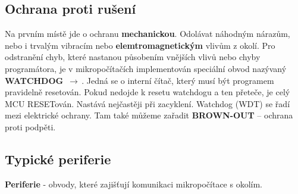 \subsection{Ochrana proti rušení}
Na prvním místě jde o ochranu \textbf{mechanickou}. Odolávat náhodným nárazům, nebo i trvalým vibracím nebo \textbf{elemtromagnetickým} vlivům z okolí. Pro odstranění chyb, které nastanou působením vnějších vlivů nebo chyby programátora, je v mikropočítačích implementován speciální obvod nazývaný \textbf{WATCHDOG} $\,\to\,$. Jedná se o interní čítač, který musí být programem pravidelně resetován. Pokud nedojde k resetu watchdogu a ten přeteče, je celý MCU RESETován. Nastává nejčastěji při zacyklení. Watchdog (WDT) se řadí mezi elektrické ochrany. Tam také můžeme zařadit \textbf{BROWN-OUT} -- ochrana proti podpěti.

\subsection{Typické periferie}
\textbf{Periferie} - obvody, které zajišťují komunikaci mikropočítace s okolím.

